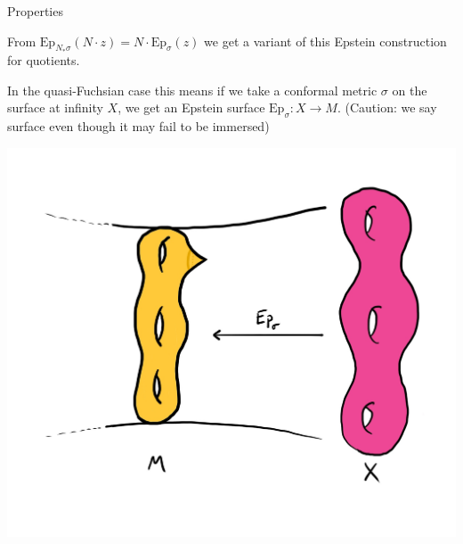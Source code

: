 \documentclass[professionalfont]{beamer}
\begin{document}



\begin{frame}{Properties}

From $\mathrm{Ep}_{N_*\sigma}(N \cdot z) = N \cdot \mathrm{Ep}_{\sigma}(z)$ we get a variant of this Epstein construction for quotients. 
\newline


In the quasi-Fuchsian case this means if we take a conformal metric $\sigma$ on the surface at infinity $X$, we get an Epstein surface $\mathrm{Ep}_\sigma: X \to M$. (Caution: we say surface even though it may fail to be immersed)

\centering\includegraphics[scale=0.12]{Quotients.jpg}

\end{frame}


\end{document}

